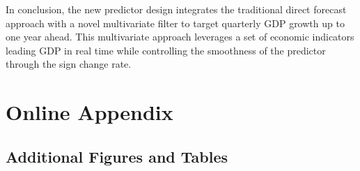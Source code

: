 \documentclass[11pt,a4paper]{article}
\begin{document}
In conclusion, the new predictor design integrates the traditional direct forecast approach with a novel multivariate filter to target quarterly GDP growth up to one year ahead. This multivariate approach leverages a set of economic indicators leading GDP in real time while controlling the smoothness of the predictor through the sign change rate. 






\appendix
\newpage
\pagestyle{fancy}
\fancyhf{} %
\fancyfoot[C]{\thepage} %

	\section{Online Appendix}\label{sec:appendix}
	\setcounter{table}{0}
	\renewcommand{\thetable}{A\arabic{table}}
	\setcounter{figure}{0}
	\renewcommand{\thefigure}{A\arabic{figure}}
	\renewcommand{\thesubsection}{\Alph{subsection}}
		\setcounter{page}{1}
	\renewcommand{\thepage}{A-\arabic{page}}




\subsection{Additional Figures and Tables}
\end{document}
